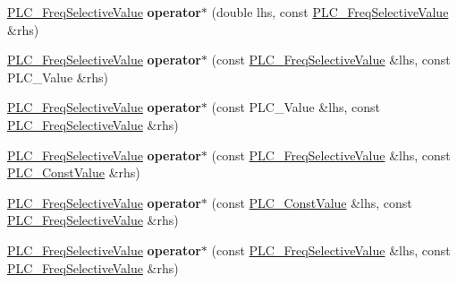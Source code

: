 \begin{DoxyCompactItemize}
\item 
\hypertarget{classns3_1_1PLC__FreqSelectiveValue_a3d35c89b1576eadf5527bfaee21b7165}{\hyperlink{classns3_1_1PLC__FreqSelectiveValue}{\-P\-L\-C\-\_\-\-Freq\-Selective\-Value} {\bfseries operator$\ast$} (double lhs, const \hyperlink{classns3_1_1PLC__FreqSelectiveValue}{\-P\-L\-C\-\_\-\-Freq\-Selective\-Value} \&rhs)}\label{classns3_1_1PLC__FreqSelectiveValue_a3d35c89b1576eadf5527bfaee21b7165}

\item 
\hypertarget{classns3_1_1PLC__FreqSelectiveValue_a0f370d8675c59ab45174eda3caa9620d}{\hyperlink{classns3_1_1PLC__FreqSelectiveValue}{\-P\-L\-C\-\_\-\-Freq\-Selective\-Value} {\bfseries operator$\ast$} (const \hyperlink{classns3_1_1PLC__FreqSelectiveValue}{\-P\-L\-C\-\_\-\-Freq\-Selective\-Value} \&lhs, const \-P\-L\-C\-\_\-\-Value \&rhs)}\label{classns3_1_1PLC__FreqSelectiveValue_a0f370d8675c59ab45174eda3caa9620d}

\item 
\hypertarget{classns3_1_1PLC__FreqSelectiveValue_ab9b63465b5d9a2a271b3ff873308d290}{\hyperlink{classns3_1_1PLC__FreqSelectiveValue}{\-P\-L\-C\-\_\-\-Freq\-Selective\-Value} {\bfseries operator$\ast$} (const \-P\-L\-C\-\_\-\-Value \&lhs, const \hyperlink{classns3_1_1PLC__FreqSelectiveValue}{\-P\-L\-C\-\_\-\-Freq\-Selective\-Value} \&rhs)}\label{classns3_1_1PLC__FreqSelectiveValue_ab9b63465b5d9a2a271b3ff873308d290}

\item 
\hypertarget{classns3_1_1PLC__FreqSelectiveValue_a6a17fe9e638b3515f4cf30f940d524b1}{\hyperlink{classns3_1_1PLC__FreqSelectiveValue}{\-P\-L\-C\-\_\-\-Freq\-Selective\-Value} {\bfseries operator$\ast$} (const \hyperlink{classns3_1_1PLC__FreqSelectiveValue}{\-P\-L\-C\-\_\-\-Freq\-Selective\-Value} \&lhs, const \hyperlink{classns3_1_1PLC__ConstValue}{\-P\-L\-C\-\_\-\-Const\-Value} \&rhs)}\label{classns3_1_1PLC__FreqSelectiveValue_a6a17fe9e638b3515f4cf30f940d524b1}

\item 
\hypertarget{classns3_1_1PLC__FreqSelectiveValue_a5e9a217f12df86aabaa6f79ac85e2eeb}{\hyperlink{classns3_1_1PLC__FreqSelectiveValue}{\-P\-L\-C\-\_\-\-Freq\-Selective\-Value} {\bfseries operator$\ast$} (const \hyperlink{classns3_1_1PLC__ConstValue}{\-P\-L\-C\-\_\-\-Const\-Value} \&lhs, const \hyperlink{classns3_1_1PLC__FreqSelectiveValue}{\-P\-L\-C\-\_\-\-Freq\-Selective\-Value} \&rhs)}\label{classns3_1_1PLC__FreqSelectiveValue_a5e9a217f12df86aabaa6f79ac85e2eeb}

\item 
\hypertarget{classns3_1_1PLC__FreqSelectiveValue_acd68b73fd67314ed739aa1a8990a7c93}{\hyperlink{classns3_1_1PLC__FreqSelectiveValue}{\-P\-L\-C\-\_\-\-Freq\-Selective\-Value} {\bfseries operator$\ast$} (const \hyperlink{classns3_1_1PLC__FreqSelectiveValue}{\-P\-L\-C\-\_\-\-Freq\-Selective\-Value} \&lhs, const \hyperlink{classns3_1_1PLC__FreqSelectiveValue}{\-P\-L\-C\-\_\-\-Freq\-Selective\-Value} \&rhs)}\label{classns3_1_1PLC__FreqSelectiveValue_acd68b73fd67314ed739aa1a8990a7c93}


\end{DoxyCompactItemize}
